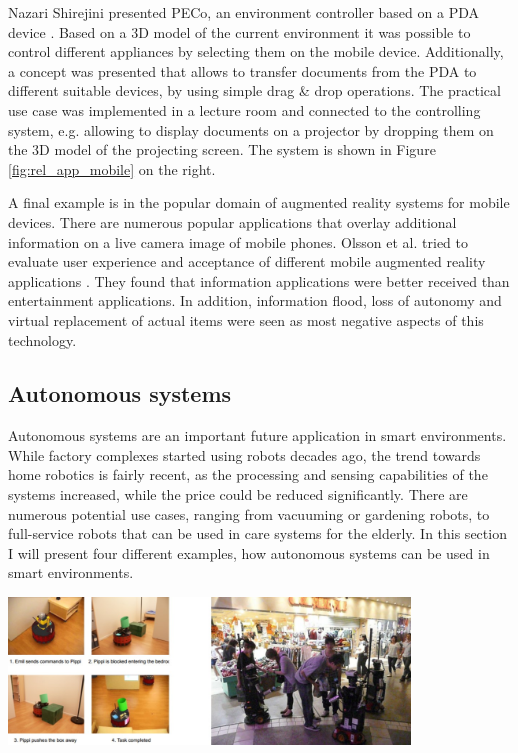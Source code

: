 Nazari Shirejini presented PECo, an environment controller based on a PDA device \cite{shirehjini2004novel}. Based on a 3D model of the current environment it was possible to control different appliances by selecting them on the mobile device. Additionally, a concept was presented that allows to transfer documents from the PDA to different suitable devices, by using simple drag \& drop operations. The practical use case was implemented in a lecture room and connected to the controlling system, e.g. allowing to display documents on a projector by dropping them on the 3D model of the projecting screen. The system is shown in Figure \ref{fig:rel_app_mobile} on the right.

A final example is in the popular domain of augmented reality systems for mobile devices. There are numerous popular applications that overlay additional information on a live camera image of mobile phones. Olsson et al. tried to evaluate user experience and acceptance of different mobile augmented reality applications \cite{olsson2012user}. They found that information applications were better received than entertainment applications. In addition, information flood, loss of autonomy and virtual replacement of actual items were seen as most negative aspects of this technology.


\subsection{Autonomous systems}
Autonomous systems are an important future application in smart environments. While factory complexes started using robots decades ago, the trend towards home robotics is fairly recent, as the processing and sensing capabilities of the systems increased, while the price could be reduced significantly. There are numerous potential use cases, ranging from vacuuming or gardening robots, to full-service robots that can be used in care systems for the elderly. In this section I will present four different examples, how autonomous systems can be used in smart environments.

\begin{minipage}{\linewidth}
\centering
\includegraphics[width=0.8\textwidth]{images/rel_app_robots}
\label{fig:rel_app_robots}
\end{minipage}

